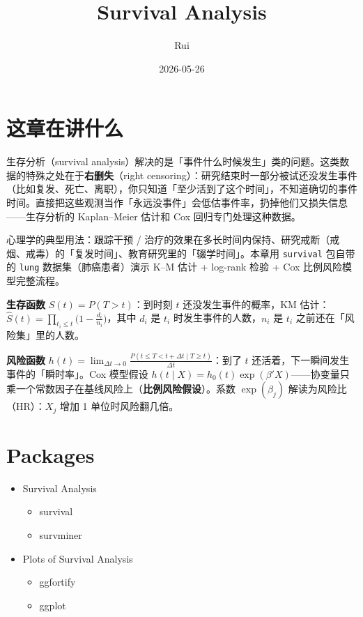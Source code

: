 \documentclass[
]{ctexart}
\title{Survival Analysis}
\author{Rui}
\date{2026-05-26}
\providecommand{\tightlist}{%
  \setlength{\itemsep}{0pt}\setlength{\parskip}{0pt}}
\begin{document}
\maketitle

{
\setcounter{tocdepth}{2}
\tableofcontents
}
\hypertarget{ux8fd9ux7ae0ux5728ux8bb2ux4ec0ux4e48}{%
\section{这章在讲什么}\label{ux8fd9ux7ae0ux5728ux8bb2ux4ec0ux4e48}}

生存分析（survival
analysis）解决的是「事件什么时候发生」类的问题。这类数据的特殊之处在于\textbf{右删失}（right
censoring）：研究结束时一部分被试还没发生事件（比如复发、死亡、离职），你只知道「至少活到了这个时间」，不知道确切的事件时间。直接把这些观测当作「永远没事件」会低估事件率，扔掉他们又损失信息------生存分析的
Kaplan--Meier 估计和 Cox 回归专门处理这种数据。

心理学的典型用法：跟踪干预 /
治疗的效果在多长时间内保持、研究戒断（戒烟、戒毒）的「复发时间」、教育研究里的「辍学时间」。本章用
\texttt{survival} 包自带的 \texttt{lung} 数据集（肺癌患者）演示 K--M
估计 + log-rank 检验 + Cox 比例风险模型完整流程。

\begin{concept}[两个关键对象]
\textbf{生存函数} $S(t) = P(T > t)$：到时刻 $t$ 还没发生事件的概率，KM 估计：$\hat S(t) = \prod_{t_i \le t} \big(1 - \frac{d_i}{n_i}\big)$，其中 $d_i$ 是 $t_i$ 时发生事件的人数，$n_i$ 是 $t_i$ 之前还在「风险集」里的人数。

\textbf{风险函数} $h(t) = \lim_{\Delta t \to 0} \frac{P(t \le T < t+\Delta t \mid T \ge t)}{\Delta t}$：到了 $t$ 还活着，下一瞬间发生事件的「瞬时率」。Cox 模型假设 $h(t \mid X) = h_0(t) \exp(\beta'X)$——协变量只乘一个常数因子在基线风险上（\textbf{比例风险假设}）。系数 $\exp(\beta_j)$ 解读为风险比（HR）：$X_j$ 增加 1 单位时风险翻几倍。
\end{concept}

\hypertarget{packages}{%
\section{Packages}\label{packages}}

\begin{itemize}
\tightlist
\item
  Survival Analysis

  \begin{itemize}
  \tightlist
  \item
    survival
  \item
    survminer
  \end{itemize}
\item
  Plots of Survival Analysis

  \begin{itemize}
  \tightlist
  \item
    ggfortify
  \item
    ggplot
  \end{itemize}
\end{itemize}
\end{document}
